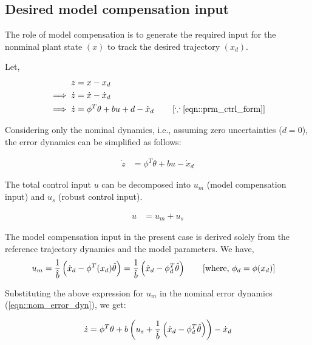\subsection{Desired model compensation input}
The role of model compensation is to generate the required input for the
nonminal plant state $(x)$ to track the desired trajectory $(x_d)$.

Let,
\begin{align}
    z &= x - x_d\\
    \implies \dot z &= \dot x - \dot x_d\\
    \implies \dot z &= \phi^T \theta +  bu + d - \dot x_d \qquad \left[ \because \ref{eqn::prm_ctrl_form} \right]
    \label{eqn::error_dyn}
\end{align}

Considering only the nominal dynamics, i.e., assuming zero uncertainties ($d = 0$), the error dynamics can be simplified as follows:

\begin{align}
    \dot z &= \phi^T \theta + bu - \dot x_d
    \label{eqn::nom_error_dyn}
\end{align}

The total control input $u$ can be decomposed into $u_m$ (model compensation input) and $u_s$ (robust control input).

\begin{align}
    u &= u_m + u_s
\end{align}

The model compensation input in the present case is derived solely from the
reference trajectory dynamics and the model parameters. We have,
\begin{align}
    u_m &= \frac{1}{\hat b} \left( \dot x_d - \phi^T(x_d) \hat \theta \right)
         = \frac{1}{\hat b} \left( \dot x_d - \phi^T_d \hat \theta \right)
         \qquad \left[ \text{where, } \phi_d  = \phi(x_d) \right]
\end{align}

Substituting the above expression for $u_m$ in the nominal error dynamics (\ref{eqn::nom_error_dyn}), we get:

\begin{align}
    \dot z &= \phi^T \theta + b \left( u_s + \frac{1}{\hat b} \left( \dot x_d - \phi^T_d \hat \theta \right) \right) - \dot x_d\\
\end{align}
